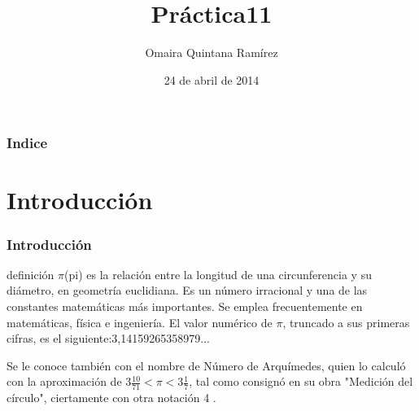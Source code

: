 \documentclass{beamer}
\title[Otro mensaje]{Práctica11}
\author[El Máquina]{Omaira Quintana Ramírez}
\institute {Fac. Mat.}
\date[xx/xx/xxxx]{24 de abril de 2014}
\begin{document}
\begin{frame}
\titlepage
\end{frame}


\begin{frame}
\frametitle{Indice}

\tableofcontents[pausesections] %
\end{frame}

\section {Introducción} 
\begin{frame}
\frametitle{Introducción}
\begin {block}{definición}
$\pi$(pi) es la relación entre la longitud de una circunferencia y su diámetro, en geometría euclidiana. Es un número irracional y una de las constantes matemáticas más importantes. Se emplea frecuentemente en matemáticas, física e ingeniería. El valor numérico de $\pi$, truncado a sus primeras cifras, es el siguiente:3,14159265358979...


Se le conoce también con el nombre de Número de Arquímedes, quien lo calculó con la aproximación de $3\frac{10}{71} < \pi < 3\frac{1}{7}$, tal como consignó en su obra "Medición del círculo", ciertamente con otra notación 4 .
\end {block}
\end {frame}







\end{document}
